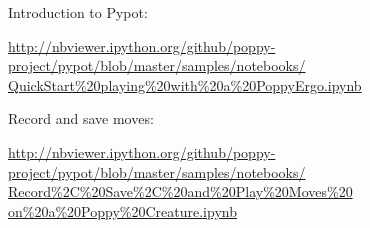 \documentclass{article}
\begin{document}
Introduction to Pypot:
\begin{flushright}
\href{http://nbviewer.ipython.org/github/poppy-project/pypot/blob/master/samples/notebooks/QuickStart%20playing%20with%20a%20PoppyErgo.ipynb}{http://nbviewer.ipython.org/github/poppy-project/pypot/blob/master/samples/notebooks/\\QuickStart\%20playing\%20with\%20a\%20PoppyErgo.ipynb} 
\end{flushright}

Record and save moves:
\begin{flushright}
\href{http://nbviewer.ipython.org/github/poppy-project/pypot/blob/master/samples/notebooks/Record%2C%20Save%2C%20and%20Play%20Moves%20on%20a%20Poppy%20Creature.ipynb}{http://nbviewer.ipython.org/github/poppy-project/pypot/blob/master/samples/notebooks/\\Record\%2C\%20Save\%2C\%20and\%20Play\%20Moves\%20\\on\%20a\%20Poppy\%20Creature.ipynb} 
\end{flushright}
\end{document}
